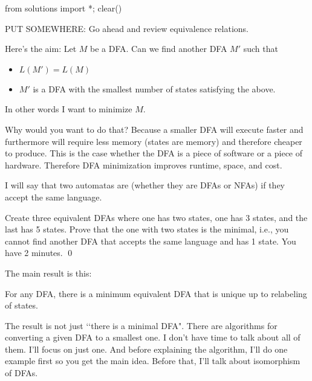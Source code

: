 \begin{python0}
  from solutions import *; clear()
\end{python0}


PUT SOMEWHERE: Go ahead and review equivalence relations.

Here's the aim: Let $M$ be a DFA. Can we find another DFA $M'$ such
that
\begin{itemize}
\item $L(M') = L(M)$
\item $M'$ is a DFA with the smallest number of states satisfying
  the above.
\end{itemize}
In other words I want to minimize $M$.

Why would you want to do that?
Because a smaller DFA will execute faster and
furthermore will require less memory (states are memory)
and therefore cheaper to produce.
This is the case whether the DFA is a piece of software
or a piece of hardware.
Therefore DFA minimization improves runtime, space,
and cost.

I will say that two automatas are  (whether they
are DFAs or NFAs) if they
accept the same language.

\begin{ex}
  Create three equivalent DFAs
  where
  one has two states, one has 3 states, and the last has 5 states.
  Prove that the one with two states is the minimal, i.e.,
  you cannot find another DFA that accepts the same language
  and has 1 state.
  You have 2 minutes.
  \qed
\end{ex}

The main result is this:

\begin{thm}
  For any DFA, there is a minimum equivalent DFA that is unique
  up to relabeling of states.
\end{thm}

The result is not just \lq\lq there is a minimal DFA".
There are algorithms for converting a given DFA to a smallest one.
I don't have time to talk about all of them.
I'll focus on just one.
And before explaining the algorithm, I'll do one example
first so you get the main idea.
Before that, I'll talk about isomorphism of DFAs.

